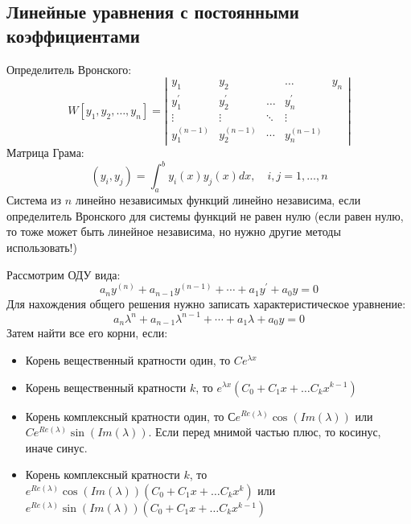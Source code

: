 \documentclass[twoside, a4paperpt, fleqn]{extarticle}
\begin{document}
    \subsection{Линейные уравнения с постоянными коэффициентами}
    Определитель Вронского:
    \begin{equation*}
        W\left[y_{1}, y_{2}, \ldots, y_{n}\right]=\left|\begin{array}{ccccc}
        y_{1} & y_{2} & & \ldots & y_{n} \\
        y_{1}^{\prime} & y_{2}^{\prime} & \ldots & y_{n}^{\prime} \\
        \vdots & \vdots & \ddots & \vdots \\
        y_{1}^{(n-1)} & y_{2}^{(n-1)} & \cdots & y_{n}^{(n-1)}
        \end{array}\right|
    \end{equation*}
    Матрица Грама:
    \begin{equation*}
        \left(y_{i}, y_{j}\right)=\int_{a}^{b} y_{i}(x) y_{j}(x) d x, \quad i, j=1, \ldots, n
    \end{equation*}
    Система из $n$ линейно независимых функций линейно независима, если определитель Вронского для системы функций не равен нулю (если равен нулю, то тоже может быть линейное независима, но нужно другие методы использовать!)%
    
    Рассмотрим ОДУ вида:
    \begin{equation*}
        a_{n} y^{(n)}+a_{n-1} y^{(n-1)}+\cdots+a_{1} y^{\prime}+a_{0} y=0
    \end{equation*}
    Для нахождения общего решения нужно записать характеристическое уравнение:
    \begin{equation*}
        a_{n} \lambda^{n}+a_{n-1} \lambda^{n-1}+\cdots+a_{1} \lambda +a_{0} y=0
    \end{equation*}
    Затем найти все его корни, если:
    \begin{itemize}
        \item Корень вещественный кратности один, то $C e^{\lambda x}$
        \item Корень вещественный кратности $k$, то $e^{\lambda x}(C_0 + C_1 x + \dots C_k x^{k-1})$ 
        \item Корень комплексный кратности один, то $С e^{Re(\lambda)} \cos (Im(\lambda))$ или $Ce^{Re(\lambda)} \sin (Im(\lambda))$. Если перед мнимой частью плюс, то косинус, иначе синус.
        \item Корень комплексный кратности $k$, то $e^{Re(\lambda)} \cos (Im(\lambda))(C_0 + C_1 x + \dots C_k x^k)$ или $e^{Re(\lambda)} \sin (Im(\lambda))(C_0 + C_1 x + \dots C_k x^{k-1})$
    \end{itemize}
\end{document}
